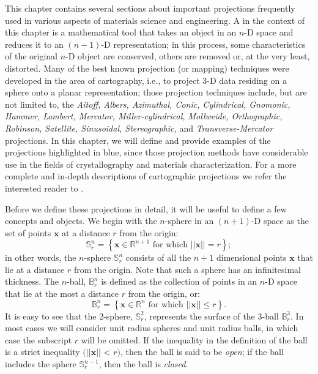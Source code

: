 This chapter contains several sections about important projections frequently used in various aspects of materials science and engineering.  A  in the context of this chapter is a mathematical tool that takes an object in an $n$-D space and reduces it to an $(n-1)$-D representation; in this process, some characteristics of the original $n$-D object are conserved, others are removed or, at the very least, distorted.  Many of the best known projection (or mapping) techniques were developed in the area of cartography, i.e., to project 3-D data residing on a sphere onto a planar representation; those projection techniques include, but are not limited to, the \textit{Aitoff, Albers, Azimuthal, Conic, Cylindrical, {\color{OCHighlandsSkyBlue}Gnomonic}, Hammer, {\color{OCHighlandsSkyBlue}Lambert}, Mercator, Miller-cylindrical, Mollweide, Orthographic, Robinson, Satellite, Sinusoidal, {\color{OCHighlandsSkyBlue}Stereographic},} and \textit{Transverse-Mercator} projections.  In this chapter, we will define and provide examples of the projections highlighted in blue, since those projection methods have considerable use in the fields of crystallography and materials characterization.  For a more complete and in-depth descriptions of cartographic projections we refer the interested reader to \cite{xxx}.

Before we define these projections in detail, it will be useful to define a few concepts and objects.  We begin with the $n$-sphere in an $(n+1)$-D space as the set of points $\mathbf{x}$ at a distance $r$ from the origin:
\begin{equation}
	\mathbb{S}^n_r = \left\{ \mathbf{x}\in\mathbb{R}^{n+1} \text{ for which } \vert\vert\mathbf{x}\vert\vert = r\right\};
\end{equation}
in other words, the $n$-sphere $\mathbb{S}^n_r$ consists of all the $n+1$ dimensional points $\mathbf{x}$ that lie at a distance $r$ from the origin.  Note that such a sphere has an infinitesimal thickness.  The $n$-ball, $\mathbb{B}^n_r$ is defined as the collection of points in an $n$-D space that lie at the most a distance $r$ from the origin, or:
\begin{equation}
	\mathbb{B}^n_r = \left\{ \mathbf{x}\in\mathbb{R}^{n} \text{ for which } \vert\vert\mathbf{x}\vert\vert \le r\right\}.
\end{equation}
It is easy to see that the $2$-sphere, $\mathbb{S}^2_r$, represents the surface of the $3$-ball $\mathbb{B}^3_r$.  In most cases we will consider unit radius spheres and unit radius balls, in which case the subscript $r$ will be omitted.  If the inequality in the definition of the ball is a strict inequality $(\vert\vert\mathbf{x}\vert\vert$ < $r)$, then the ball is said to be \textit{open}; if the ball includes the sphere $\mathbb{S}^{n-1}_r$, then the ball is \textit{closed}.

